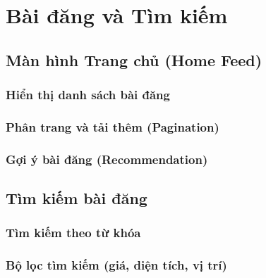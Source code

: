 
\chapter{Bài đăng và Tìm kiếm}

\section{Màn hình Trang chủ (Home Feed)}

\subsection{Hiển thị danh sách bài đăng}


\subsection{Phân trang và tải thêm (Pagination)}


\subsection{Gợi ý bài đăng (Recommendation)}


\section{Tìm kiếm bài đăng}

\subsection{Tìm kiếm theo từ khóa}


\subsection{Bộ lọc tìm kiếm (giá, diện tích, vị trí)}


